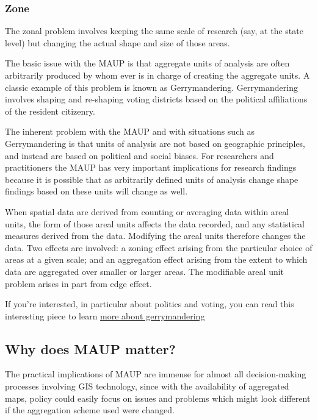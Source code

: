 \documentclass[
]{book}
\begin{document}
\hypertarget{zone}{%
\subsubsection{Zone}\label{zone}}

The zonal problem involves keeping the same scale of research (say, at the state level) but changing the actual shape and size of those areas.

The basic issue with the MAUP is that aggregate units of analysis are often arbitrarily produced by whom ever is in charge of creating the aggregate units. A classic example of this problem is known as Gerrymandering. Gerrymandering involves shaping and re-shaping voting districts based on the political affiliations of the resident citizenry.

The inherent problem with the MAUP and with situations such as Gerrymandering is that units of analysis are not based on geographic principles, and instead are based on political and social biases. For researchers and practitioners the MAUP has very important implications for research findings because it is possible that as arbitrarily defined units of analysis change shape findings based on these units will change as well.

When spatial data are derived from counting or averaging data within areal units, the form of those areal units affects the data recorded, and any statistical measures derived from the data. Modifying the areal units therefore changes the data. Two effects are involved: a zoning effect arising from the particular choice of areas at a given scale; and an aggregation effect arising from the extent to which data are aggregated over smaller or larger areas. The modifiable areal unit problem arises in part from edge effect.

If you're interested, in particular about politics and voting, you can read this interesting piece to learn \href{https://projects.fivethirtyeight.com/redistricting-maps/}{more about gerrymandering}

\hypertarget{why-does-maup-matter}{%
\subsection{Why does MAUP matter?}\label{why-does-maup-matter}}

The practical implications of MAUP are immense for almost all decision-making processes involving GIS technology, since with the availability of aggregated maps, policy could easily focus on issues and problems which might look different if the aggregation scheme used were changed.
\end{document}
